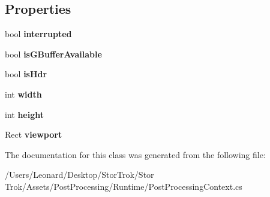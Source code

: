 \subsection*{Properties}
\begin{DoxyCompactItemize}
\item 
\mbox{\label{class_unity_engine_1_1_post_processing_1_1_post_processing_context_ab93ab5b37f664bd229c322164ca5bf70}} 
bool {\bfseries interrupted}
\item 
\mbox{\label{class_unity_engine_1_1_post_processing_1_1_post_processing_context_ac66f43731d1ae15bb7d0b1fb2884826e}} 
bool {\bfseries is\+G\+Buffer\+Available}
\item 
\mbox{\label{class_unity_engine_1_1_post_processing_1_1_post_processing_context_a4b5a681cde9e4aca82c23981d2130539}} 
bool {\bfseries is\+Hdr}
\item 
\mbox{\label{class_unity_engine_1_1_post_processing_1_1_post_processing_context_a6998d843d59216ccb88e6fd343fb7306}} 
int {\bfseries width}
\item 
\mbox{\label{class_unity_engine_1_1_post_processing_1_1_post_processing_context_ab1c293d501b4437e15c58d98b07c8b4b}} 
int {\bfseries height}
\item 
\mbox{\label{class_unity_engine_1_1_post_processing_1_1_post_processing_context_a8a1709dc0cdb5e5f7db01f7723f4baf3}} 
Rect {\bfseries viewport}
\end{DoxyCompactItemize}


The documentation for this class was generated from the following file\+:\begin{DoxyCompactItemize}
\item 
/\+Users/\+Leonard/\+Desktop/\+Stor\+Trok/\+Stor Trok/\+Assets/\+Post\+Processing/\+Runtime/Post\+Processing\+Context.\+cs\end{DoxyCompactItemize}
